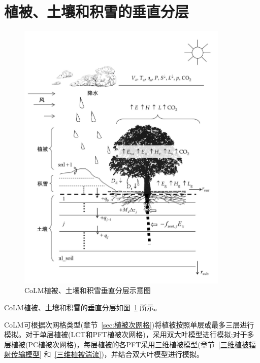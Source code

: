 \section{植被、土壤和积雪的垂直分层}\label{土壤和积雪的垂直分层}

{
  \begin{figure}[htbp]
    \centering
    \includegraphics[width=0.9\textwidth]{Figures/模式构架/CoLM模式概念图_v2.jpg}
    \caption[CoLM植被、土壤和积雪垂直分层示意图]{CoLM植被、土壤和积雪垂直分层示意图}
    \label{fig:CoLM垂直分层}
  \end{figure}
}

CoLM植被、土壤和积雪的垂直分层如图~\ref{fig:CoLM垂直分层} 所示。

CoLM可根据次网格类型(章节~\ref{sec:植被次网格})将植被按照单层或最多三层进行模拟。对于单层植被(LCT和PFT植被次网格)，采用双大叶模型进行模拟\citep{dai2004two};对于多层植被(PC植被次网格)，每层植被的各PFT采用三维植被模型(章节~\ref{三维植被辐射传输模型} 和~\ref{三维植被湍流})，并结合双大叶模型进行模拟。


